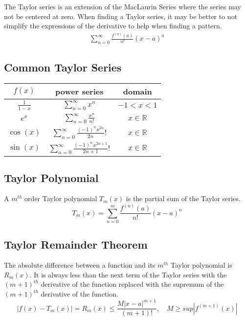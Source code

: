 \documentclass{article}
\theoremstyle{mytheoremstyle}
\theoremstyle{mytheoremstyle}
\theoremstyle{myproblemstyle}
\begin{document}
    The Taylor series is an extension of the MacLaurin Series where the series
    may not be centered at zero. When finding a Taylor series, it may be better
    to not simplify the expressions of the derivative to help when finding a
    pattern.
    \begin{align*}
        \sum_{n=0}^{\infty} \frac{f^{(n)}(a)}{n!} (x-a)^n
    \end{align*}

    \subsection*{Common Taylor Series}
    \begin{center}
    \renewcommand{\arraystretch}{2}
    \begin{tabular}[c]{c|c|c}
        $f(x)$ & power series & domain \\
        \hline
        $\frac{1}{1-x}$
        & $\sum_{n=0}^\infty x^n$
        & $-1 < x < 1$ \\

        $e^x$
        & $\sum_{n=0}^\infty \frac{x^n}{n!}$
        & $x\in\mathbb{R}$ \\

        $\cos(x)$
        & $\sum_{n=0}^\infty \frac{(-1)^nx^{2n}}{2n}!$
        & $x\in\mathbb{R}$ \\

        $\sin(x)$
        & $\sum_{n=0}^\infty \frac{(-1)^nx^{2n+1}}{2n+1}!$
        & $x\in\mathbb{R}$
    \end{tabular}
    \end{center}

    \subsection*{Taylor Polynomial}
    A $m^{th}$ order Taylor polynomial $T_m(x)$ is the partial sum of the Taylor
    series.
    \[
        T_m(x) = \sum_{n=0}^{m} \frac{f^{(n)}(a)}{n!} (x-a)^n
    \]

    \subsection*{Taylor Remainder Theorem}
    The absolute difference between a function and its $m^{th}$ Taylor
    polynomial is $R_m(x)$. It is always less than the next term of the Taylor
    series with the $(m+1)^{th}$ derivative of the function replaced with the
    supremum of the $(m+1)^{th}$ derivative of the function.
    \[
        |f(x) - T_m(x)| = R_m(x) \le \frac{M|x-a|^{m+1}}{(m+1)!}, \quad
        M \ge sup|f^{(m+1)}(x)|
    \]
\end{document}
